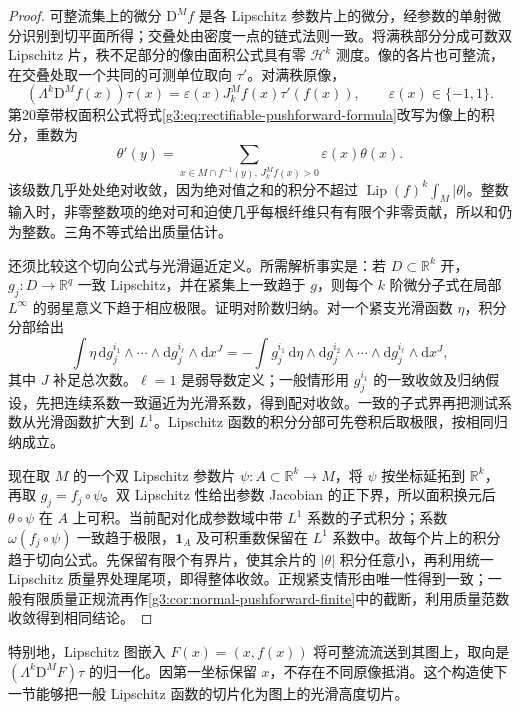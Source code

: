 \begin{proof}
	可整流集上的微分 \(\mathrm D^Mf\) 是各 Lipschitz 参数片上的微分，经参数的单射微分识别到切平面所得；交叠处由密度一点的链式法则一致。将满秩部分分成可数双 Lipschitz 片，秩不足部分的像由面积公式具有零 \(\mathcal H^k\) 测度。像的各片也可整流，在交叠处取一个共同的可测单位取向 \(\tau'\)。对满秩原像，
	\[
		(\Lambda^k\mathrm D^Mf(x))\tau(x)
		=\varepsilon(x)J_k^Mf(x)\tau'(f(x)),\qquad \varepsilon(x)\in\{-1,1\}.
	\]
	第20章带权面积公式将式\eqref{g3:eq:rectifiable-pushforward-formula}改写为像上的积分，重数为
	\[
		\theta'(y)=\sum_{x\in M\cap f^{-1}(y),\,J_k^Mf(x)>0}
		\varepsilon(x)\theta(x).
	\]
	该级数几乎处处绝对收敛，因为绝对值之和的积分不超过 \(\operatorname{Lip}(f)^k\int_M|\theta|\)。整数输入时，非零整数项的绝对可和迫使几乎每根纤维只有有限个非零贡献，所以和仍为整数。三角不等式给出质量估计。

	还须比较这个切向公式与光滑逼近定义。所需解析事实是：若 \(D\subset\mathbb R^k\) 开，\(g_j:D\to\mathbb R^q\) 一致 Lipschitz，并在紧集上一致趋于 \(g\)，则每个 \(k\) 阶微分子式在局部 \(L^\infty\) 的弱星意义下趋于相应极限。证明对阶数归纳。对一个紧支光滑函数 \(\eta\)，积分分部给出
	\[
		\int\eta\,\mathrm dg_j^{i_1}\wedge\cdots\wedge\mathrm dg_j^{i_\ell}
		\wedge\mathrm dx^J
		=-\int g_j^{i_1}\,\mathrm d\eta\wedge\mathrm dg_j^{i_2}
		\wedge\cdots\wedge\mathrm dg_j^{i_\ell}\wedge\mathrm dx^J,
	\]
	其中 \(J\) 补足总次数。\(\ell=1\) 是弱导数定义；一般情形用 \(g_j^{i_1}\) 的一致收敛及归纳假设，先把连续系数一致逼近为光滑系数，得到配对收敛。一致的子式界再把测试系数从光滑函数扩大到 \(L^1\)。Lipschitz 函数的积分分部可先卷积后取极限，按相同归纳成立。

	现在取 \(M\) 的一个双 Lipschitz 参数片 \(\psi:A\subset\mathbb R^k\to M\)，将 \(\psi\) 按坐标延拓到 \(\mathbb R^k\)，再取 \(g_j=f_j\circ\psi\)。双 Lipschitz 性给出参数 Jacobian 的正下界，所以面积换元后 \(\theta\circ\psi\) 在 \(A\) 上可积。当前配对化成参数域中带 \(L^1\) 系数的子式积分；系数 \(\omega(f_j\circ\psi)\) 一致趋于极限，\(\mathbf1_A\) 及可积重数保留在 \(L^1\) 系数中。故每个片上的积分趋于切向公式。先保留有限个有界片，使其余片的 \(|\theta|\) 积分任意小，再利用统一 Lipschitz 质量界处理尾项，即得整体收敛。正规紧支情形由唯一性得到一致；一般有限质量正规流再作\cref{g3:cor:normal-pushforward-finite}中的截断，利用质量范数收敛得到相同结论。
\end{proof}

特别地，Lipschitz 图嵌入 \(F(x)=(x,f(x))\) 将可整流流送到其图上，取向是 \((\Lambda^k\mathrm D^MF)\tau\) 的归一化。因第一坐标保留 \(x\)，不存在不同原像抵消。这个构造使下一节能够把一般 Lipschitz 函数的切片化为图上的光滑高度切片。

